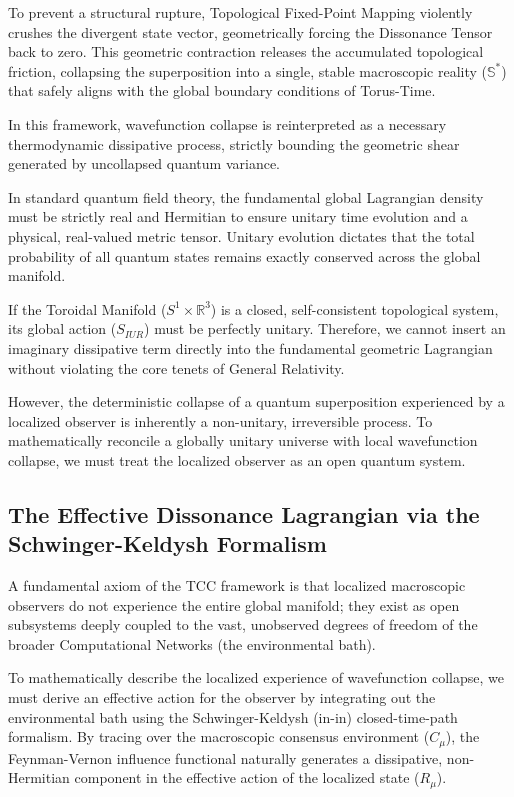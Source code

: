 \documentclass[12pt,openany]{book}
\theoremstyle{plain}
\theoremstyle{definition}
\theoremstyle{remark}
\begin{document}
To prevent a structural rupture, Topological Fixed-Point Mapping violently crushes the divergent state vector, geometrically forcing the Dissonance Tensor back to zero. This geometric contraction releases the accumulated topological friction, collapsing the superposition into a single, stable macroscopic reality ($\mathbb{S}^*$) that safely aligns with the global boundary conditions of Torus-Time.

In this framework, wavefunction collapse is reinterpreted as a necessary thermodynamic dissipative process, strictly bounding the geometric shear generated by uncollapsed quantum variance.

In standard quantum field theory, the fundamental global Lagrangian density must be strictly real and Hermitian to ensure unitary time evolution and a physical, real-valued metric tensor. Unitary evolution dictates that the total probability of all quantum states remains exactly conserved across the global manifold.

If the Toroidal Manifold ($S^1 \times \mathbb{R}^3$) is a closed, self-consistent topological system, its global action ($S_{IUR}$) must be perfectly unitary. Therefore, we cannot insert an imaginary dissipative term directly into the fundamental geometric Lagrangian without violating the core tenets of General Relativity.

However, the deterministic collapse of a quantum superposition experienced by a localized observer is inherently a non-unitary, irreversible process. To mathematically reconcile a globally unitary universe with local wavefunction collapse, we must treat the localized observer as an open quantum system.

\subsection* {The Effective Dissonance Lagrangian via the Schwinger-Keldysh Formalism}
A fundamental axiom of the TCC framework is that localized macroscopic observers do not experience the entire global manifold; they exist as open subsystems deeply coupled to the vast, unobserved degrees of freedom of the broader Computational Networks (the environmental bath).

To mathematically describe the localized experience of wavefunction collapse, we must derive an effective action for the observer by integrating out the environmental bath using the Schwinger-Keldysh (in-in) closed-time-path formalism. By tracing over the macroscopic consensus environment ($C_\mu$), the Feynman-Vernon influence functional naturally generates a dissipative, non-Hermitian component in the effective action of the localized state ($R_\mu$).
\end{document}

